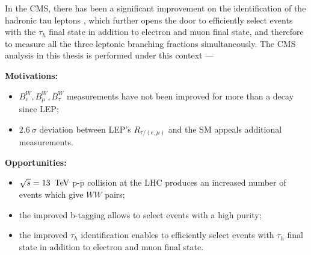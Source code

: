 In the CMS, there has been a significant improvement on the identification of the hadronic tau leptons \cite{Chatrchyan:2012zz, Khachatryan:2015dfa, Sirunyan:2018pgf}, which further opens the door to efficiently select \ttbar events with the $\tau_h$ final state in addition to electron and muon final state, and therefore to measure all the three leptonic branching fractions simultaneously. The CMS analysis in this thesis is performed under this context ---

    


    \noindent \textbf{Motivations:}
        \begin{itemize}
            \item $B^W_e, B^W_\mu ,B^W_\tau$ measurements have not been improved for more than a decay since LEP;
            \item $2.6~\sigma$ deviation between LEP's $R_{\tau/(e,\mu)}$ and the SM appeals additional measurements.
        \end{itemize}
    
    \noindent \textbf{Opportunities:}
        \begin{itemize}
            \item $\sqrt{s}=13~\,\text{Te\hspace{-.08em}V}$ p-p collision at the LHC produces an increased number of \ttbar events which give $WW$ pairs;
            \item the improved b-tagging allows to select \ttbar events with a high purity;
            \item the improved $\tau_h$ identification enables to efficiently select \ttbar events with $\tau_h$ final state in addition to electron and muon final state.
        \end{itemize}


